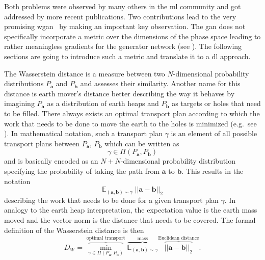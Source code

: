 Both problems were observed by many others in the \gls{ml} community and got addressed by more recent publications. Two contributions lead to the very promising \gls{wgan}~\cite{wgan, impwgan} by making an important key observation. The \gls{gan} does not specifically incorporate a metric over the dimensions of the phase space leading to rather meaningless gradients for the generator network (see ). The following sections are going to introduce such a metric and translate it to a \gls{dl} approach.

\label{sssec:wasserstein}

The Wasserstein distance is a measure between two \(N\)-dimensional probability distributions \(P_{\bm a}\) and \(P_{\bm b}\) and assesses their similarity.
Another name for this distance is earth mover's distance better describing the way it behaves by imagining \(P_{\bm a}\) as a distribution of earth heaps and \(P_{\bm b}\) as targets or holes that need to be filled.
There always exists an optimal transport plan according to which the work that needs to be done to move the earth to the holes is minimized (e.g.\ see ).
In mathematical notation, such a transport plan \(\gamma \) is an element of all possible transport plans between \(P_{\bm a}\), \(P_{\bm b}\) which can be written as \begin{equation}
    \gamma \in \Pi (P_{\bm a}, P_{\bm b})
\end{equation} and is basically encoded as an \(N+N\)-dimensional probability distribution specifying the probability of taking the path from \(\bm{a}\) to \(\bm{b}\).
This results in the notation \begin{equation}
    \mathbb{E}_{(\bm a, \bm b) \sim \gamma} \; || \bm a - \bm b ||_2
\end{equation}
describing the work that needs to be done for a given transport plan \(\gamma \). In analogy to the earth heap interpretation, the expectation value is the earth mass moved and the vector norm is the distance that needs to be covered. The formal definition of the Wasserstein distance is then \begin{equation}
    D_W = \overbrace{\min_{\gamma \in \Pi (P_{\bm a}, P_{\bm b})}}^\text{optimal transport} \overbrace{\mathbb{E}_{(\bm a, \bm b) \sim \gamma}}^\text{mass} \overbrace{|| \bm a - \bm b ||_2}^\text{Euclidean distance} .
\end{equation}


